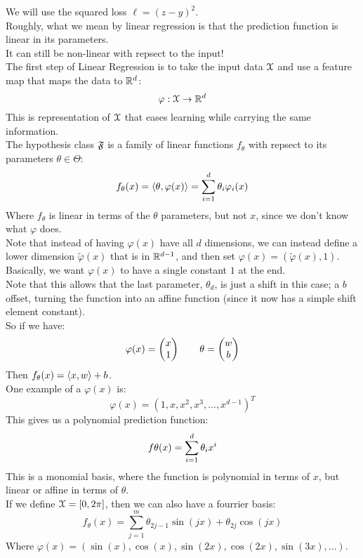 \documentclass[12pt]{article}
\begin{document}
We will use the squared loss $\ell = (z- y)^2$. \\

Roughly, what we mean by linear regression is that
the prediction function is linear in its parameters. \\
It can still be non-linear with repsect to
the input! \\

The first step of Linear Regression is 
to take the input data $\mathcal{X}$ and use a feature
map that maps the data to $\mathbb{R}^d$:
\[ \varphi: \mathcal{X} \to \mathbb{R}^d \]
This is representation of $\mathcal{X}$ 
that eases learning while carrying the same
information. \\

The hypothesis class $\mathfrak{F}$ is a family of
linear functions $f_\theta$ with
repsect to its parameters $\theta \in \Theta$:
\[ f_\theta(x) = \left\langle \theta, \varphi(x) \right\rangle
= \sum_{i = 1}^d \theta_i \varphi_i(x) \]
Where $f_\theta$ is linear in terms of the
$\theta$ parameters, but not $x$,
since we don't know what $\varphi$ does. \\

Note that instead of having $\varphi(x)$
have all $d$ dimensions, we can instead define
a lower dimension $\tilde{\varphi}(x)$
that is in $\mathbb{R}^{d-1}$,
and then set $\varphi(x) = (\tilde{\varphi}(x), 1)$. \\
Basically, we want $\varphi(x)$ to have
a single constant $1$ at the end. \\
Note that this allows that the last parameter,
$\theta_d$, is just a shift in this case;
a $b$ offset,
turning the function into an affine function
(since it now has a simple shift element constant). \\
So if we have:
\[ \varphi(x) = \begin{pmatrix} x \\ 1 \end{pmatrix} \qquad
\theta = \begin{pmatrix} w \\ b \end{pmatrix} \] 
Then $f_\theta(x) = \left\langle x, w \right\rangle + b$. \\

One example of a $\varphi(x)$ is:
\[ \varphi(x) = (1, x, x^2, x^3, \dots, x^{d-1})^T \]
This gives us a polynomial prediction function:
\[ f\theta(x) = \sum_{i=1}^{d}\theta_i x^i \]
This is a monomial basis, where the function
is polynomial in terms of $x$,
but linear or affine in terms of $\theta$. \\

If we define $\mathcal{X} = [0, 2\pi]$,
then we can also have a fourrier basis:
\[ f_\theta(x)
= \sum_{j = 1}^{m} \theta_{2j-1}\sin(jx) 
+ \theta_{2j}\cos(jx) \]
Where $\varphi(x) = (\sin(x), \cos(x),
\sin(2x), \cos(2x), \sin(3x), \dots)$. \\
\end{document}
